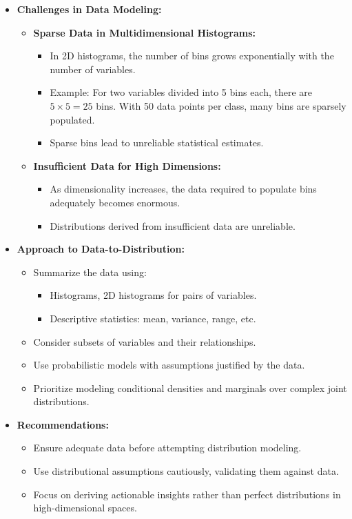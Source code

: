 \documentclass{article}
\begin{document}
\begin{itemize}
  \item \textbf{Challenges in Data Modeling:}
    \begin{itemize}
      \item \textbf{Sparse Data in Multidimensional Histograms:}
        \begin{itemize}
          \item In 2D histograms, the number of bins grows exponentially with the number of variables.
          \item Example: For two variables divided into 5 bins each, there are $5 \times 5 = 25$ bins. With 50 data points per class, many bins are sparsely populated.
          \item Sparse bins lead to unreliable statistical estimates.
        \end{itemize}
      \item \textbf{Insufficient Data for High Dimensions:}
        \begin{itemize}
          \item As dimensionality increases, the data required to populate bins adequately becomes enormous.
          \item Distributions derived from insufficient data are unreliable.
        \end{itemize}
    \end{itemize}

  \item \textbf{Approach to Data-to-Distribution:}
    \begin{itemize}
      \item Summarize the data using:
        \begin{itemize}
          \item Histograms, 2D histograms for pairs of variables.
          \item Descriptive statistics: mean, variance, range, etc.
        \end{itemize}
      \item Consider subsets of variables and their relationships.
      \item Use probabilistic models with assumptions justified by the data.
      \item Prioritize modeling conditional densities and marginals over complex joint distributions.
    \end{itemize}

  \item \textbf{Recommendations:}
    \begin{itemize}
      \item Ensure adequate data before attempting distribution modeling.
      \item Use distributional assumptions cautiously, validating them against data.
      \item Focus on deriving actionable insights rather than perfect distributions in high-dimensional spaces.
    \end{itemize}
\end{itemize}
\end{document}
